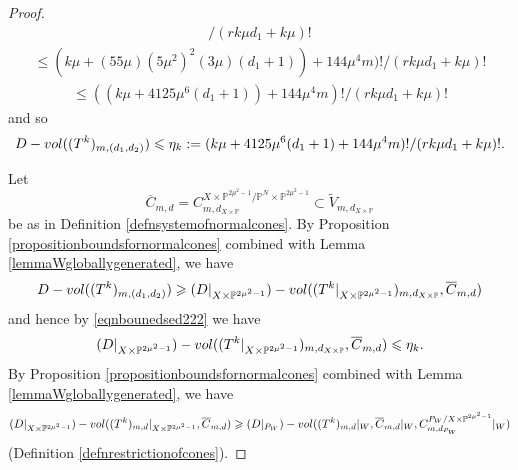 \documentclass[10pt,a4paper]{amsart}
\newcommand{\Vol}{\textnormal{-vol}}
\newcommand{\bP}{\mathbb{P}}
\renewcommand{\geq}{\geqslant}
\renewcommand{\leq}{\leqslant}
\begin{document}
\begin{proof}
\begin{equation}
\begin{aligned}
			/ (rk\mu d_1 + k\mu)!
		\end{aligned}
	\end{equation}
	\begin{equation}
		\begin{aligned}
			\leq
			(k\mu+(55\mu)(5\mu^2)^2(3\mu)(d_1+1)) + 144\mu^4m)!
			/ (rk\mu d_1 + k\mu)!
		\end{aligned}
	\end{equation}
	\begin{equation}
		\begin{aligned}
			\leq
			((k\mu+ 4125\mu^6(d_1+1)) + 144\mu^4m)!
			/ (rk\mu d_1 + k\mu)!
		\end{aligned}
	\end{equation}
	and so
	\begin{equation} \label{eqnbounedsed222}
		\begin{aligned}
			D\Vol((T^k)_{m,(d_1,d_2)}) \leq
			\eta_k :=
			(k\mu+ 4125\mu^6(d_1+1) + 144\mu^4m)!
			/ (rk\mu d_1 + k\mu)!.
		\end{aligned}
	\end{equation}

	Let \begin{equation}
		\overline{C}_{m,d} = C^{X \times \bP^{2\mu^2-1}/\bP^N \times \bP^{2\mu^2-1}}_{m,d_{X \times \bP}} \subset \widetilde{V}_{m,d_{X \times \bP}}
	\end{equation} be as in Definition \ref{defnsystemofnormalcones}.
	By Proposition \ref{propositionboundsfornormalcones} combined with Lemma \ref{lemmaWgloballygenerated},
	we have
	\begin{equation}
		D\Vol((T^k)_{m,(d_1,d_2)}) \geq (D|_{X \times \bP^{2\mu^2-1}})\Vol((T^k|_{X \times \bP^{2\mu^2-1}})_{m,d_{X \times \bP}},\overline{C}_{m,d})
	\end{equation}
	and hence by \eqref{eqnbounedsed222} we have
	\begin{equation} \label{eqnaefaef04404040}
		(D|_{X \times \bP^{2\mu^2-1}})\Vol((T^k|_{X \times \bP^{2\mu^2-1}})_{m,d_{X \times \bP}},\overline{C}_{m,d}) \leq \eta_k.
	\end{equation}
	By Proposition \ref{propositionboundsfornormalcones} combined with Lemma \ref{lemmaWgloballygenerated},
	we have
	\begin{equation} \label{eqnaefaef044040402333prev}
		(D|_{X \times \bP^{2\mu^2-1}})\Vol((T^k)_{m,d}|_{X \times \bP^{2\mu^2-1}},\overline{C}_{m,d}) \geq (D|_{P_W})\Vol((T^k)_{m,d}|_W,\overline{C}_{m,d}|_W,C^{P_W/X \times \bP^{2\mu^2-1}}_{m,d_{P_W}}|_W)
	\end{equation}
	(Definition \ref{defnrestrictionofcones}).


\end{proof}
\end{document}
